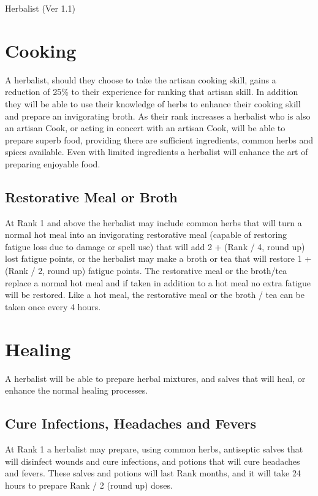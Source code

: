 \begin{Chapter}{Herbalist (Ver 1.1)}
\section{Cooking}

A herbalist, should they choose to take the artisan cooking skill,
gains a reduction of 25\% to their experience for ranking that artisan
skill.  In addition they will be able to use their knowledge of herbs
to enhance their cooking skill and prepare an invigorating broth.
As their rank increases a herbalist who is also an artisan Cook, or
acting in concert with an artisan Cook, will be able to prepare superb
food, providing there are sufficient ingredients, common herbs and
spices available.  Even with limited ingredients a herbalist will
enhance the art of preparing enjoyable food.

\subsection{Restorative Meal or Broth}

At Rank 1 and above the herbalist may include common herbs that will
turn a normal hot meal into an invigorating restorative meal (capable
of restoring fatigue loss due to damage or spell use) that will add 2
+ (Rank / 4, round up) lost fatigue points, or the herbalist may make
a broth or tea that will restore 1 + (Rank / 2, round up) fatigue
points.  The restorative meal or the broth/tea replace a normal hot
meal and if taken in addition to a hot meal no extra fatigue will be
restored.  Like a hot meal, the restorative meal or the broth / tea
can be taken once every 4 hours.

\section{Healing}

A herbalist will be able to prepare herbal mixtures, and salves that
will heal, or enhance the normal healing processes.

\subsection{Cure Infections, Headaches and Fevers}

At Rank 1 a herbalist may prepare, using common herbs, antiseptic
salves that will disinfect wounds and cure infections, and potions
that will cure headaches and fevers.  These salves and potions will
last Rank months, and it will take 24 hours to prepare Rank / 2 (round
up) doses.


\end{Chapter}
